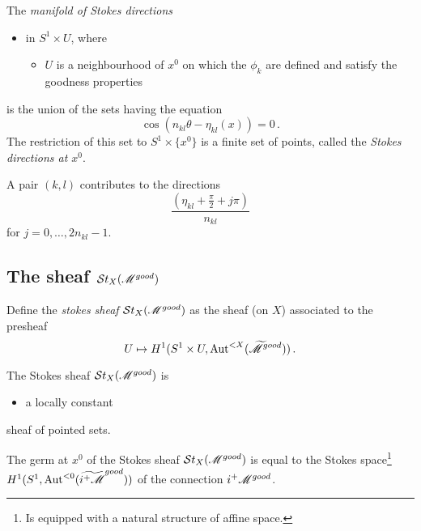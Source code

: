 \begin{defn}
  The \emph{manifold of Stokes directions}
  \begin{itemize}
    \item in $S^1\times U$, where
      \begin{itemize}
        \item $U$ is a neighbourhood of $x^0$ on which the $\phi_k$ are defined
          and satisfy the goodness properties
      \end{itemize}
  \end{itemize}
  is the union of the sets having the equation
  \[
    \cos(n_{kl}\theta-\eta_{kl}(x))=0 \,.
  \]
  The restriction of this set to $S^1\times\{x^0\}$ is a finite set of points,
  called the \emph{Stokes directions at $x^0$}.
  \begin{rem}
    A pair $(k,l)$ contributes to the directions
    \[
      \frac{\left(\eta_{kl}+\frac{\pi}{2}+j\pi\right)}{n_{kl}} 
    \]
    for $j=0,\dots,2n_{kl}-1$.
  \end{rem}
\end{defn}
\begin{ex}
\end{ex}

\subsection{The sheaf $\mathcal{S}{}t_X(\mathscr{M}^{good})$}
\begin{defn}
  Define the \emph{stokes sheaf} $\mathcal{S}{}t_X(\mathscr{M}^{good})$ as the sheaf (on $X$)
  associated to the presheaf
  \[
    U\mapsto H^1(S^1\times U,\operatorname{Aut}^{<X}(\widetilde {\mathscr{M}}^{good}))\,.
  \]
\end{defn}
\begin{thm}
  The Stokes sheaf $\mathcal{S}{}t_X(\mathscr{M}^{good})$ is
  \begin{itemize}
    \item a locally constant
  \end{itemize}
  sheaf of pointed sets.
\end{thm}
\begin{prop}
  The germ at $x^0$ of the Stokes sheaf $\mathcal{S}{}t_X(\mathscr{M}^{good})$ is equal to the
  Stokes space\footnote{Is equipped with a natural structure of affine space.}
  $H^1(S^1,\operatorname{Aut}^{<0}(\widetilde{i^+\mathscr{M}}^{good}))$ of the connection
  $i^+\mathscr{M}^{good}$.
\end{prop}

